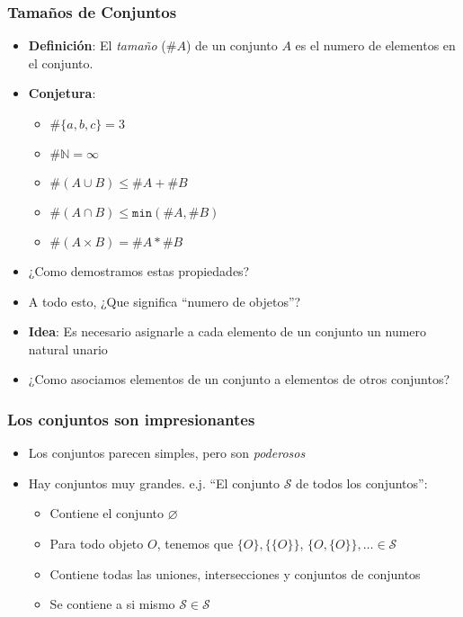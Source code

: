 \documentclass{beamer}
\begin{document}
\begin{frame}
\frametitle{Tama\~nos de Conjuntos}
\begin{itemize}
    \item{{\bf Definici\'on}: El \emph{tama\~no} (\#$A$) de un
    conjunto $A$ es el numero de elementos en el conjunto.}
    \item{{\bf Conjetura}:
    \begin{itemize}
        \item{$\#\{a,b,c\}=3$}
        \item{$\#\mathbb{N}=\infty$}
        \item{$\#(A\cup B)\leq \#A+\#B$}
        \item{$\#(A\cap B)\leq \mathtt{min}(\#A,\#B)$}
        \item{$\#(A\times B)=\#A*\#B$}
    \end{itemize}
    }
    \item{¿Como demostramos estas propiedades?}
    \item{A todo esto, ¿Que significa ``numero de objetos''?}
    \item{{\bf Idea}: Es necesario asignarle a cada elemento
    de un conjunto un numero natural unario}
    \item{¿Como asociamos elementos de un conjunto a elementos
    de otros conjuntos?}
\end{itemize}
\end{frame}

\begin{frame}
\frametitle{Los conjuntos son impresionantes}
\begin{itemize}
    \item{Los conjuntos parecen simples, pero son \emph{poderosos}}
    \item{Hay conjuntos muy grandes. e.j. ``El conjunto $\mathcal{S}$ de todos los conjuntos'':
    \begin{itemize}
        \item{Contiene el conjunto $\varnothing$}
        \item{Para todo objeto $O$, tenemos que $\{O\}, \{\{O\}\}$, $\{O,\{O\}\},\ldots\in\mathcal{S}$}
        \item{Contiene todas las uniones, intersecciones y conjuntos de conjuntos}
        \item{Se contiene a si mismo $\mathcal{S}\in\mathcal{S}$}
    \end{itemize}
    }
\end{itemize}
\end{frame}
\end{document}
